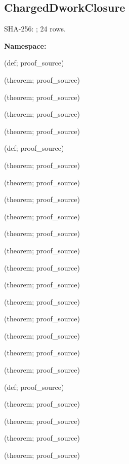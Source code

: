 \subsection*{ChargedDworkClosure}
{\footnotesize SHA-256: ; 24 rows.}\par
\begingroup\small
\textbf{Namespace:} \par
\noindent{} {\scriptsize (def; proof\_source)}\par
\noindent{} {\scriptsize (theorem; proof\_source)}\par
\noindent{} {\scriptsize (theorem; proof\_source)}\par
\noindent{} {\scriptsize (theorem; proof\_source)}\par
\noindent{} {\scriptsize (theorem; proof\_source)}\par
\noindent{} {\scriptsize (def; proof\_source)}\par
\noindent{} {\scriptsize (theorem; proof\_source)}\par
\noindent{} {\scriptsize (theorem; proof\_source)}\par
\noindent{} {\scriptsize (theorem; proof\_source)}\par
\noindent{} {\scriptsize (theorem; proof\_source)}\par
\noindent{} {\scriptsize (theorem; proof\_source)}\par
\noindent{} {\scriptsize (theorem; proof\_source)}\par
\noindent{} {\scriptsize (theorem; proof\_source)}\par
\noindent{} {\scriptsize (theorem; proof\_source)}\par
\noindent{} {\scriptsize (theorem; proof\_source)}\par
\noindent{} {\scriptsize (theorem; proof\_source)}\par
\noindent{} {\scriptsize (theorem; proof\_source)}\par
\noindent{} {\scriptsize (theorem; proof\_source)}\par
\noindent{} {\scriptsize (theorem; proof\_source)}\par
\noindent{} {\scriptsize (def; proof\_source)}\par
\noindent{} {\scriptsize (theorem; proof\_source)}\par
\noindent{} {\scriptsize (theorem; proof\_source)}\par
\noindent{} {\scriptsize (theorem; proof\_source)}\par
\noindent{} {\scriptsize (theorem; proof\_source)}\par
\endgroup
